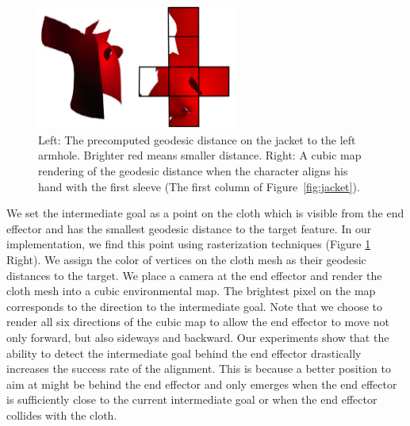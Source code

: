 \begin{figure}[!t]
  \centering
  \includegraphics[width=2.6in]{images/geodesic}
  \caption{Left: The precomputed geodesic distance on the jacket to the left armhole. Brighter red means smaller distance. Right: A cubic map rendering of the geodesic distance when the character aligns his hand with the first sleeve (The first column of Figure~\ref{fig:jacket}).}
  \label{fig:geodesic}
\end{figure}


We set the intermediate goal as a point on the cloth which is visible from the end effector and has the smallest geodesic distance to the target feature. In our implementation, we find this point using rasterization techniques (Figure \ref{fig:geodesic} Right). We assign the color of vertices on the cloth mesh as their geodesic distances to the target. We place a camera at the end effector and render the cloth mesh into a cubic environmental map. The brightest pixel on the map corresponds to the direction to the intermediate goal. Note that we choose to render all six directions of the cubic map to allow the end effector to move not only forward, but also sideways and backward. Our experiments show that the ability to detect the intermediate goal behind the end effector drastically increases the success rate of the alignment. This is because a better position to aim at might be behind the end effector and only emerges when the end effector is sufficiently close to the current intermediate goal or when the end effector collides with the cloth. 


